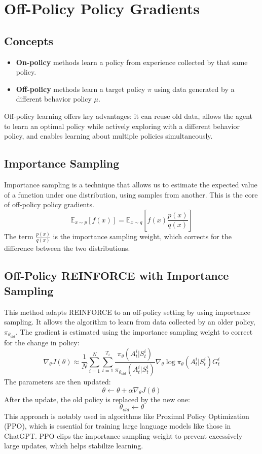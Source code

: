 \documentclass[12pt]{article}
\begin{document}
\section{Off-Policy Policy Gradients }

\subsection{Concepts}
\begin{itemize}
    \item \textbf{On-policy} methods learn a policy from experience collected by that same policy.
    \item \textbf{Off-policy} methods learn a target policy $\pi$ using data generated by a different behavior policy $\mu$.
\end{itemize}
Off-policy learning offers key advantages: it can reuse old data, allows the agent to learn an optimal policy while actively exploring with a different behavior policy, and enables learning about multiple policies simultaneously.

\subsection{Importance Sampling}
Importance sampling is a technique that allows us to estimate the expected value of a function under one distribution, using samples from another. This is the core of off-policy policy gradients.
$$ \mathbb{E}_{x \sim p}[f(x)] = \mathbb{E}_{x \sim q} \left[ f(x) \frac{p(x)}{q(x)} \right] $$
The term $\frac{p(x)}{q(x)}$ is the importance sampling weight, which corrects for the difference between the two distributions.

\subsection{Off-Policy REINFORCE with Importance Sampling}
This method adapts REINFORCE to an off-policy setting by using importance sampling. It allows the algorithm to learn from data collected by an older policy, $\pi_{\theta_{old}}$.
The gradient is estimated using the importance sampling weight to correct for the change in policy:
$$ \nabla_\theta J(\theta) \approx \frac{1}{N} \sum_{i=1}^N \sum_{t=1}^{T_i} \frac{\pi_\theta(A_t^i | S_t^i)}{\pi_{\theta_{old}}(A_t^i | S_t^i)} \nabla_\theta \log \pi_\theta(A_t^i | S_t^i) G_t^i $$
The parameters are then updated:
$$ \theta \leftarrow \theta + \alpha \nabla_\theta J(\theta) $$
After the update, the old policy is replaced by the new one:
$$ \theta_{old} \leftarrow \theta $$
This approach is notably used in algorithms like Proximal Policy Optimization (PPO), which is essential for training large language models like those in ChatGPT. PPO clips the importance sampling weight to prevent excessively large updates, which helps stabilize learning.
\end{document}
